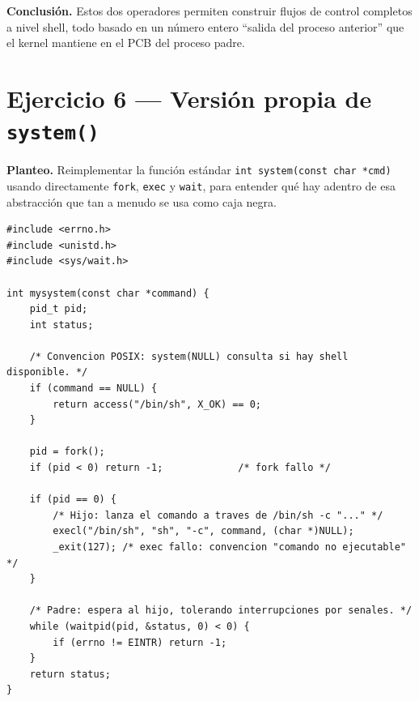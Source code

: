 \documentclass[11pt,a4paper]{article}
\begin{document}
\textbf{Conclusión.} Estos dos operadores permiten construir flujos de
control completos a nivel shell, todo basado en un número entero
``salida del proceso anterior'' que el kernel mantiene en el PCB del
proceso padre.

\section{Ejercicio 6 --- Versión propia de \texttt{system()}}

\textbf{Planteo.} Reimplementar la función estándar
\texttt{int system(const char *cmd)} usando directamente
\texttt{fork}, \texttt{exec} y \texttt{wait}, para entender qué hay
adentro de esa abstracción que tan a menudo se usa como caja negra.

\begin{lstlisting}[style=cstyle]
#include <errno.h>
#include <unistd.h>
#include <sys/wait.h>

int mysystem(const char *command) {
    pid_t pid;
    int status;

    /* Convencion POSIX: system(NULL) consulta si hay shell disponible. */
    if (command == NULL) {
        return access("/bin/sh", X_OK) == 0;
    }

    pid = fork();
    if (pid < 0) return -1;             /* fork fallo */

    if (pid == 0) {
        /* Hijo: lanza el comando a traves de /bin/sh -c "..." */
        execl("/bin/sh", "sh", "-c", command, (char *)NULL);
        _exit(127); /* exec fallo: convencion "comando no ejecutable" */
    }

    /* Padre: espera al hijo, tolerando interrupciones por senales. */
    while (waitpid(pid, &status, 0) < 0) {
        if (errno != EINTR) return -1;
    }
    return status;
}
\end{lstlisting}
\end{document}
